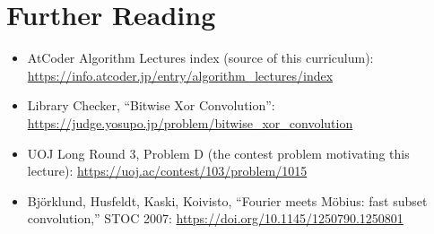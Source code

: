 \documentclass[11pt]{article}
\begin{document}
\section{Further Reading}
\begin{itemize}[leftmargin=1.5em]
  \item AtCoder Algorithm Lectures index (source of this curriculum):
        \url{https://info.atcoder.jp/entry/algorithm_lectures/index}
  \item Library Checker, ``Bitwise Xor Convolution'':
        \url{https://judge.yosupo.jp/problem/bitwise_xor_convolution}
  \item UOJ Long Round 3, Problem D (the contest problem motivating this
        lecture):
        \url{https://uoj.ac/contest/103/problem/1015}
  \item Bj\"orklund, Husfeldt, Kaski, Koivisto, ``Fourier meets M\"obius:
        fast subset convolution,'' STOC 2007:
        \url{https://doi.org/10.1145/1250790.1250801}
\end{itemize}
\end{document}
